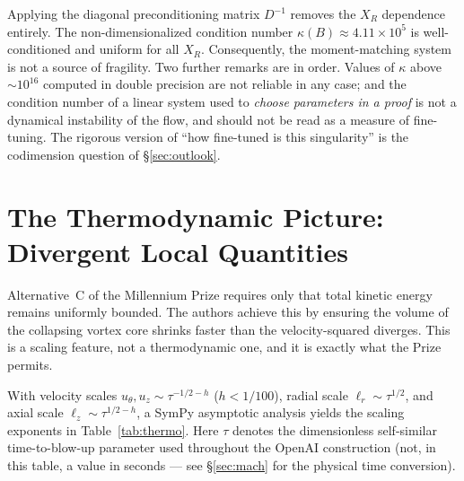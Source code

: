 \documentclass[11pt,a4paper]{article}
\begin{document}
Applying the diagonal preconditioning matrix $D^{-1}$ removes the $X_R$ dependence entirely. The non-dimensionalized condition number $\kappa(B) \approx 4.11 \times 10^5$ is well-conditioned and uniform for all $X_R$. Consequently, the moment-matching system is not a source of fragility. Two further remarks are in order. Values of $\kappa$ above $\sim10^{16}$ computed in double precision are not reliable in any case; and the condition number of a linear system used to \emph{choose parameters in a proof} is not a dynamical instability of the flow, and should not be read as a measure of fine-tuning. The rigorous version of ``how fine-tuned is this singularity'' is the codimension question of \S\ref{sec:outlook}.

\section{The Thermodynamic Picture: Divergent Local Quantities}
\label{sec:thermo}

Alternative~C of the Millennium Prize requires only that total kinetic energy remains uniformly
bounded. The authors achieve this by ensuring the volume of the collapsing vortex core shrinks
faster than the velocity-squared diverges. This is a scaling feature, not a thermodynamic one, and
it is exactly what the Prize permits.

With velocity scales $u_\theta, u_z \sim \tau^{-1/2-h}$ ($h < 1/100$), radial scale
$\ell_r \sim \tau^{1/2}$, and axial scale $\ell_z \sim \tau^{1/2-h}$, a SymPy asymptotic
analysis yields the scaling exponents in Table~\ref{tab:thermo}. Here $\tau$ denotes the
dimensionless self-similar time-to-blow-up parameter used throughout the OpenAI construction
(not, in this table, a value in seconds --- see \S\ref{sec:mach} for the physical time
conversion).
\end{document}
